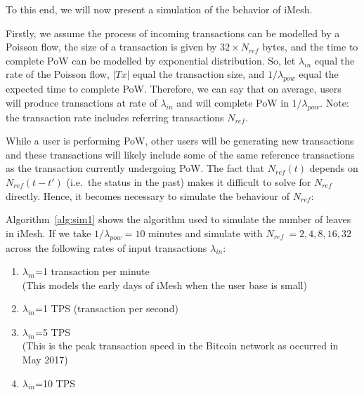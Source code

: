 \documentclass[a4paper,10pt,twocolumn]{article}
\begin{document}
To this end, we will now present a simulation of the behavior of iMesh.

Firstly, we assume the process of incoming transactions can be modelled by a Poisson flow, the size of a transaction is given by \(32 \times N_{ref}\) bytes, and the time to complete PoW can be modelled by exponential distribution.
So, let \(\lambda_{in}\) equal the rate of the Poisson flow, \(|Tx|\) equal the transaction size, and \(1 / \lambda_{pow}\) equal the expected time to complete PoW.
Therefore, we can say that on average, users will produce transactions at rate of \(\lambda_{in}\) and will complete PoW in \(1/\lambda_{pow}\). Note: the transaction rate includes referring transactions \( N_{ref}\).

While a user is performing PoW, other users will be generating new transactions and these transactions will likely include some of the same reference transactions as the transaction currently undergoing PoW.
The fact that \( N_{ref} (t) \) depends on \( N_{ref} (t-t')\) (i.e.\ the status in the past) makes it difficult 
to solve for \( N_{ref}\) directly. Hence, it becomes necessary to simulate the behaviour of \( N_{ref}\):

Algorithm~\ref{alg:sim1} shows the algorithm used to simulate the number of leaves in iMesh.
If we take \(1 / \lambda_{pow} = 10 \) minutes and simulate with \(N_{ref}\ = 2, 4, 8, 16, 32 \) across the following rates of input transactions \(\lambda_{in} \):

\vspace{-0.5\baselineskip}
\begin{enumerate}
	\setlength\itemsep{0em}
\item \(\lambda_{in} \)=1 transaction per minute \\
 (This models the early days of iMesh when the user base is small)
\item \(\lambda_{in} \)=1 TPS (transaction per second)
\item \(\lambda_{in} \)=5 TPS \\
 (This is the peak transaction speed in the Bitcoin network as occurred in May 2017)
 \item \(\lambda_{in} \)=10 TPS
\end{enumerate}
\end{document}
